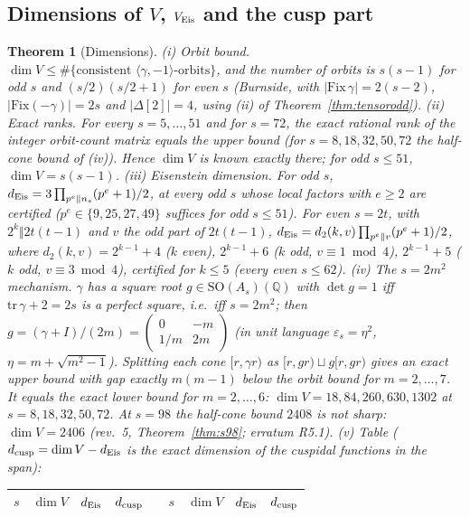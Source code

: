 \documentclass[11pt]{article}
\newtheorem{theorem}{Theorem}[section]
\theoremstyle{definition}
\newcommand{\Q}{\mathbb{Q}}
\begin{document}
\subsection{Dimensions of $V$, $V_{\rm Eis}$ and the cusp part}
\begin{theorem}[Dimensions]\label{thm:dims}
(i) \emph{Orbit bound.} $\dim V\le\#\{\text{consistent }\langle\gamma,-1\rangle\text{-orbits}\}$, and the number of orbits is $s(s-1)$ for odd $s$ and
$(s/2)(s/2+1)$ for even $s$ (Burnside, with $|\mathrm{Fix}\,\gamma|=2(s-2)$, $|\mathrm{Fix}(-\gamma)|=2s$ and $|\Delta[2]|=4$, using (ii) of Theorem~\ref{thm:tensorodd}).
(ii) \emph{Exact ranks.} For every $s=5,\dots,51$ and for $s=72$, the exact rational rank of the integer orbit-count matrix equals the upper bound
(for $s=8,18,32,50,72$ the half-cone bound of (iv)). Hence $\dim V$ is known exactly there; for odd $s\le51$, $\dim V=s(s-1)$.
(iii) \emph{Eisenstein dimension.} For odd $s$, $d_{\rm Eis}=3\prod_{p^e\Vert n_s}(p^e+1)/2$, at every odd $s$ whose local factors with $e\ge2$ are certified
($p^e\in\{9,25,27,49\}$ suffices for odd $s\le51$). For even $s=2t$, with $2^k\Vert2t(t-1)$ and $v$ the odd part of $2t(t-1)$,
$d_{\rm Eis}=d_2(k,v)\prod_{p^e\Vert v}(p^e+1)/2$, where $d_2(k,v)=2^{k-1}+4$ ($k$ even), $2^{k-1}+6$ ($k$ odd, $v\equiv1\bmod4$), $2^{k-1}+5$ ($k$ odd,
$v\equiv3\bmod4$), certified for $k\le5$ (every even $s\le62$).
(iv) \emph{The $s=2m^2$ mechanism.} $\gamma$ has a square root $g\in\mathrm{SO}(A_s)(\Q)$ with $\det g=1$ iff $\mathrm{tr}\,\gamma+2=2s$ is a perfect square, i.e.\ iff
$s=2m^2$; then $g=(\gamma+I)/(2m)=\begin{pmatrix}0&-m\\1/m&2m\end{pmatrix}$ (in unit language $\varepsilon_s=\eta^2$, $\eta=m+\sqrt{m^2-1}$). Splitting each cone
$[r,\gamma r)$ as $[r,gr)\sqcup g[r,gr)$ gives an exact upper bound with gap exactly $m(m-1)$ below the orbit bound for $m=2,\dots,7$. It equals the exact lower
bound for $m=2,\dots,6$: $\dim V=18,84,260,630,1302$ at $s=8,18,32,50,72$. At $s=98$ the half-cone bound $2408$ is not sharp: $\dim V=2406$ (rev.~5, Theorem~\ref{thm:s98}; erratum R5.1).
(v) \emph{Table} ($d_{\rm cusp}=\dim V-d_{\rm Eis}$ is the exact dimension of the cuspidal functions in the span):
\begin{center}\small
\begin{longtable}{rrrrcrrrr}\toprule
$s$ & $\dim V$ & $d_{\rm Eis}$ & $d_{\rm cusp}$ && $s$ & $\dim V$ & $d_{\rm Eis}$ & $d_{\rm cusp}$\\\midrule\endhead

\end{longtable}
\end{center}
\end{theorem}
\end{document}
